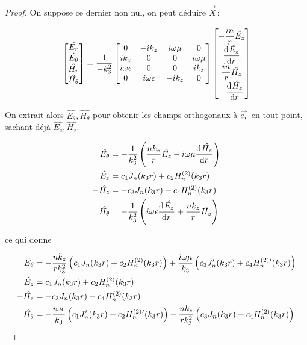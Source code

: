 \begin{proof}
    On suppose ce dernier non nul, on peut déduire \(\vect{X}\):

    \begin{equation*}
      \begin{bmatrix}
        \hat{E_r}\\
        \hat{E_\theta}\\
        \hat{H_r}\\
        \hat{H_\theta}
      \end{bmatrix} =
      \frac{1}{-k_3^2}
      \begin{bmatrix}
      0 & -ik_z & i\w\mu & 0
      \\
      ik_z & 0 & 0 & i\w\mu
      \\
      i\w\eps & 0 & 0 & ik_z
      \\
      0 & i\w\eps & -ik_z & 0
      \end{bmatrix}
      \begin{bmatrix}
        -\frac{in}{r}\hat{E_z}\\
        \ddp{r}{\hat{E_z}}\\
        \frac{in}{r}\hat{H_z}\\
        -\ddp{r}{\hat{H_z}}
      \end{bmatrix}
    \end{equation*}

    On extrait alors \(\hat{E_\theta}, \hat{H_\theta}\) pour obtenir les champs orthogonaux à \(\vect{e_r}\) en tout point, sachant déjà \(\hat{E_z}, \hat{H_z}\).

    \begin{align*}
      \hat{E_\theta} &= -\frac{1}{k_3^2}\left(\frac{nk_z}{r}\hat{E_z} - i\w\mu\ddp{r}{\hat{H_z}}\right)
      \\
      \hat{E_z} &= c_1 J_n(k_3 r) + c_2 H_n^{(2)}(k_3 r)
      \\
      -\hat{H_z} &= -c_3 J_n(k_3 r) - c_4 H_n^{(2)}(k_3 r)
      \\
      \hat{H_\theta} &= -\frac{1}{k_3^2}\left(i\w\eps\ddp{r}{\hat{E_z}} + \frac{nk_z}{r}\hat{H_z}\right)
    \end{align*}

    ce qui donne

     \begin{align*}
      \hat{E_\theta} &= -\frac{nk_z}{rk_3^2}\left(c_1J_n(k_3r) + c_2 H_n^{(2)}(k_3r)\right) + \frac{i\w\mu}{k_3}\left(c_3J_n'(k_3r) + c_4 H_n^{(2)}{}'(k_3r)\right)
      \\
      \hat{E_z} &= c_1 J_n(k_3 r) + c_2 H_n^{(2)}(k_3 r)
      \\
      -\hat{H_z} &= -c_3 J_n(k_3 r) - c_4 H_n^{(2)}(k_3 r)
      \\
      \hat{H_\theta} &= -\frac{i\w\eps}{k_3}\left(c_1J_n'(k_3r) + c_2 H_n^{(2)}{}'(k_3r)\right) - \frac{nk_z}{rk_3^2}\left(c_3J_n(k_3r) + c_4 H_n^{(2)}(k_3r)\right)
    \end{align*}

  \end{proof}

